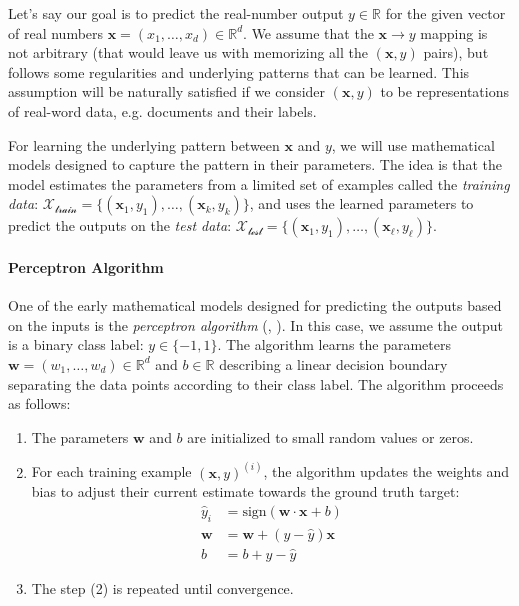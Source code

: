 Let's say our goal is to predict the real-number output $y \in \mathbb{R}$ for the given vector of real numbers $\mathbf{x} = (x_1, \ldots, x_d) \in \mathbb{R}^d$.
We assume that the $\mathbf{x} \rightarrow y$ mapping is not arbitrary (that would leave us with memorizing all the $(\mathbf{x},y)$ pairs), but follows some regularities and underlying patterns that can be learned. This assumption will be naturally satisfied if we consider $(\mathbf{x},y)$ to be representations of real-word data, e.g. documents and their labels.

For learning the underlying pattern between $\mathbf{x}$ and $y$, we will use mathematical models designed to capture the pattern in their parameters. The idea is that the model estimates the parameters from a limited set of examples called the \textit{training data}:  $\mathcal{X_{\text{train}}} = \{(\mathbf{x}_1, y_1), \ldots, (\mathbf{x}_{k}, y_{k})\}$, and uses the learned parameters to predict the outputs on the \textit{test data}: $\mathcal{X_{\text{test}}} = \{(\mathbf{x}_{1}, y_{1}), \ldots, (\mathbf{x}_{\ell}, y_{\ell})\}$.

\paragraph{Perceptron Algorithm} One of the early mathematical models designed for predicting the outputs based on the inputs is the \emph{perceptron algorithm} (\citealp{rosenblatt1958perceptron}, \citealp[p.~192]{bishop2006pattern}). In this case, we assume the output is a binary class label: $y \in \{-1, 1\}$. The algorithm learns the parameters $\textbf{w} = (w_1, \ldots, w_d) \in \mathbb{R}^d$ and $b \in \mathbb{R}$ describing a linear decision boundary separating the data points according to their class label. The algorithm proceeds as follows:


\begin{enumerate}
    \item The parameters $\textbf{w}$ and $b$ are initialized to small random values or zeros.
    \item For each training example $(\mathbf{x}, y)^{(i)}$, the algorithm updates the weights and bias to adjust their current estimate towards the ground truth target:
          \begin{align} \label{eq:perceptron1}
              \hat{y}_i  & = \text{sign}(\textbf{w} \cdot \mathbf{x} + b) \\
              \textbf{w} & = \textbf{w} + (y - \hat{y}) \textbf{x}        \\
              b          & = b + y - \hat{y}
          \end{align}
    \item The step (2) is repeated until convergence.
\end{enumerate}

